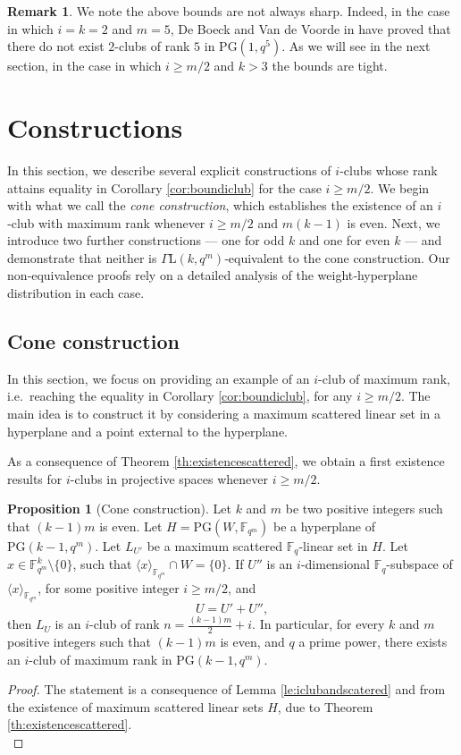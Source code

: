 \documentclass[11pt]{amsart}
\theoremstyle{definition}
\newtheorem{proposition}[theorem]{Proposition}
\newtheorem{remark}[theorem]{Remark}
\newcommand{\fq}{{\mathbb F}_{q}}
\newcommand{\PG}{\mathrm{PG}}
\newcommand{\fqm}{\mathbb{F}_{q^m}}
\begin{document}
\begin{remark}
    We note the above bounds are not always sharp. Indeed, in the case in which $i=k=2$ and $m=5$, De Boeck and Van de Voorde in \cite{de2016linear} have proved that there do not exist $2$-clubs of rank $5$ in $\PG(1,q^5)$.
    As we will see in the next section, in the case in which $i\geq m/2$ and $k>3$ the bounds are tight. 
\end{remark}
 
\section{Constructions}\label{sec:constr}

In this section, we describe several explicit constructions of $i$‑clubs whose rank attains equality in Corollary \ref{cor:boundiclub} for the case $i \geq m/2$. We begin with what we call the \emph{cone construction}, which establishes the existence of an $i$‑club with maximum rank whenever $i\ge m/2$ and $m(k-1)$ is even. Next, we introduce two further constructions — one for odd $k$ and one for even $k$ — and demonstrate that neither is $\Gamma\mathrm{L}(k,q^m)$‑equivalent to the cone construction. Our non‐equivalence proofs rely on a detailed analysis of the weight‐hyperplane distribution in each case.

\subsection{Cone construction}

In this section, we focus on providing an example of an $i$-club of maximum rank, i.e.\ reaching the equality in Corollary \ref{cor:boundiclub}, for any $i\geq m/2$. 
The main idea is to construct it by considering a maximum scattered linear set in a hyperplane and a point external to the hyperplane.

As a consequence of Theorem \ref{th:existencescattered}, we obtain a first existence results for $i$-clubs in projective spaces whenever $i\geq m/2$.

\begin{proposition}[Cone construction]\label{prop:coneconstruct}
    Let $k$ and $m$ be two positive integers such that $(k-1)m$ is even.
    Let $H=\PG(W,\fqm)$ be a hyperplane of $\mathrm{PG}(k-1,q^m)$. Let $L_{U'}$ be a maximum scattered $\fq$-linear set in $H$.
    Let $x\in \mathbb{F}_{q^m}^k\setminus\{0\}$, such that $\langle x\rangle_{\mathbb{F}_{q^m}}\cap  W= \{0\}$. If $U''$ is an $i$-dimensional $\fq$-subspace of $\langle x\rangle_{\mathbb{F}_{q^m}}$, for some positive integer $i\geq m/2$, and 
    $$U=U'+U'',$$
    then $L_U$ is an $i$-club of rank $n=\frac{(k-1)m}{2}+i$.
    In particular, for every $k$ and $m$ positive integers such that $(k-1)m$ is even, and $q$ a prime power, there exists an $i$-club of maximum rank in $\mathrm{PG}(k-1,q^m)$.
\end{proposition}
\begin{proof}
     The statement is a consequence of Lemma \ref{le:iclubandscatered} and from the existence of maximum scattered linear sets $H$, due to Theorem \ref{th:existencescattered}.\\
\end{proof}
\end{document}
